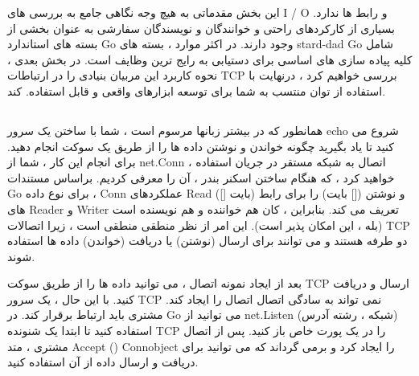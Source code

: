 \documentclass[12pt]{book}
\begin{document}
{این بخش مقدماتی به هیچ وجه نگاهی جامع به بررسی های I / O و رابط ها ندارد. بسیاری از کارکردهای راحتی و خوانندگان و نویسندگان سفارشی به عنوان بخشی از بسته های استاندارد Go وجود دارند. در اکثر موارد ، بسته های stard-dad Go شامل کلیه پیاده سازی های اساسی برای دستیابی به رایج ترین وظایف است. در بخش بعدی ، نحوه کاربرد این مربیان بنیادی را در ارتباطات TCP بررسی خواهیم کرد ، درنهایت با استفاده از توان منتسب به شما برای توسعه ابزارهای واقعی و قابل استفاده. کند.
\subsection{}
همانطور که در بیشتر زبانها مرسوم است ، شما با ساختن یک سرور echo شروع می کنید تا یاد بگیرید چگونه خواندن و نوشتن داده ها را از طریق یک سوکت انجام دهید. برای انجام این کار ، شما از net.Conn ، اتصال به شبکه مستقر در جریان استفاده خواهید کرد ، که هنگام ساختن اسکنر بندر ، آن را معرفی کردیم. براساس مستندات Go برای نوع داده ، Conn عملکردهای Read ([] بایت) و نوشتن ([] بایت) را برای رابط های Reader و Writer تعریف می کند. بنابراین ، کان هم خواننده و هم نویسنده است (بله ، این امکان پذیر است). این امر از نظر منطقی منطقی است ، زیرا اتصالات TCP دو طرفه هستند و می توانند برای ارسال (نوشتن) یا دریافت (خواندن) داده ها استفاده شوند.

بعد از ایجاد نمونه اتصال ، می توانید داده ها را از طریق سوکت TCP ارسال و دریافت کنید. با این حال ، یک سرور TCP نمی تواند به سادگی اتصال اتصال را ایجاد کند. مشتری باید ارتباط برقرار کند. در Go می توانید از net.Listen (شبکه ، رشته آدرس) استفاده کنید تا ابتدا یک شنونده TCP را در یک پورت خاص باز کنید. پس از اتصال مشتری ، متد Accept () Connobject را ایجاد کرد و برمی گرداند که می توانید برای دریافت و ارسال داده از آن استفاده کنید.

}
\end{document}
